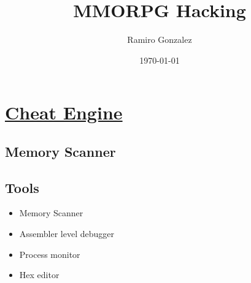 \documentclass[12pt]{article}
\begin{document}
\title{ MMORPG Hacking}
\author{Ramiro Gonzalez}
\date{\today}

\maketitle
\section{\href{https://www.cheatengine.org/}{\color{blue} Cheat Engine\color{black}}}
\subsection{Memory Scanner} 

\subsection{Tools}
\begin{itemize}
    \item Memory Scanner 
    \item Assembler level debugger
    \item Process monitor 
    \item Hex editor
\end{itemize}
\end{document}
